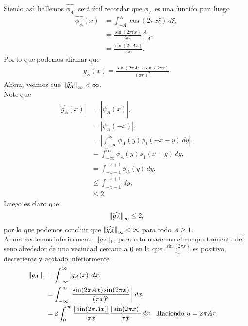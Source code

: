 \begin{homeworkProblem}
\begin{solution}
\begin{enumerate}[(i)]
\begin{align*}
        \end{align*}
        Siendo así, hallemos $\hat{\phi_{A}}$, será útil recordar que $\phi_{A}$ es una función par, luego
        \begin{align*}
          \hat{\phi_{A}}(x)&=\int_{-A}^{A}\cos(2\pi x\xi)\, d\xi,\\
          &=\frac{\sin(2\pi \xi x)}{2\pi x}\Bigg|_{-A}^{A},\\
          &=\frac{\sin(2\pi Ax)}{\pi x}.
        \end{align*}
        Por lo que podemos afirmar que
        \begin{align*}
          g_{A}(x)=\frac{\sin(2\pi Ax)\sin(2\pi x)}{(\pi x)^2}
        \end{align*}
        Ahora, veamos que $\left\|\widehat{g_A}\right\|_{\infty}<\infty$.\\
        Note que
        \begin{align*}
          \left|\hat{g_{A}}(x)\right|&=\left|\hat{\hat{\psi_{A}}}(x)\right|,\\
          &=\left|\psi_{A}(-x)\right|,\\
          &=\left|\int_{-\infty}^{\infty}\phi_{A}(y)\phi_{1}(-x-y)\, dy\right|,\\
          &=\int_{-\infty}^{\infty}\phi_{A}(y)\phi_{1}(x+y)\, dy,\\
          &=\int_{-x-1}^{-x+1}\phi_{A}(y)\, dy,\\
          &\leq \int_{-x-1}^{-x+1}\, dy,\\
          &\leq 2.
        \end{align*}
        Luego es claro que
        \begin{align*}
          \left\|\widehat{g_A}\right\|_{\infty}\leq 2,
        \end{align*}
        por lo que podemos concluir que $\left\|\widehat{g_A}\right\|_{\infty}<\infty$ para todo $A\geq 1$.\\
        Ahora acotemos inferiormente $\left\|g_A\right\|_{1}$, para esto usaremos el comportamiento del seno alrededor de una vecindad cercana a $0$ en la que $\frac{\sin(2\pi x)}{\pi x}$ es positivo, decreciente y acotado inferiormente
        \begin{align*}
          \norm{g_A}_{1}&=\int_{-\infty}^{\infty}|g_{A}(x)|\, dx,\\
          &=\int_{-\infty}^{\infty}\left| \frac{\sin(2\pi Ax)\sin(2\pi x)}{(\pi x)^2} \right|\, dx,\\
          &=2\int_{0}^{\infty}\frac{|\sin(2\pi Ax)|}{\pi x}\frac{|\sin(2\pi x)|}{\pi x}\, dx&&\text{Haciendo $u=2\pi Ax$},\\

\end{align*}
\end{enumerate}
\end{solution}
\end{homeworkProblem}
